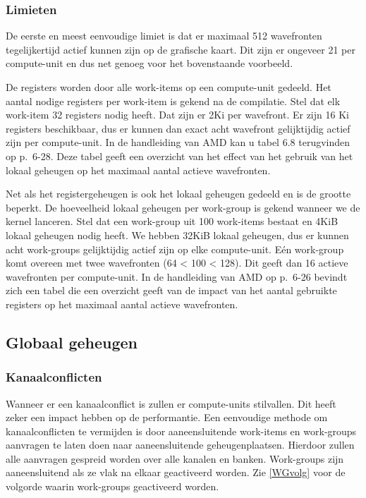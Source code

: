 \subsubsection{Limieten}
De eerste en meest eenvoudige limiet is dat er maximaal 512 wavefronten tegelijkertijd actief kunnen zijn op de grafische kaart. Dit zijn er ongeveer 21 per compute-unit en dus net genoeg voor het bovenstaande voorbeeld.

De registers worden door alle work-items op een compute-unit gedeeld. Het aantal nodige registers per work-item is gekend na de compilatie. Stel dat elk work-item 32 registers nodig heeft. Dat zijn er 2Ki per wavefront. Er zijn 16 Ki registers beschikbaar, dus er kunnen dan exact acht wavefront gelijktijdig actief zijn per compute-unit. In de handleiding van AMD \cite{amd} kan u tabel 6.8 terugvinden op p.~6-28. Deze tabel geeft een overzicht van het effect van het gebruik van het lokaal geheugen op het maximaal aantal actieve wavefronten.

Net als het registergeheugen is ook het lokaal geheugen gedeeld en is de grootte beperkt. De hoeveelheid lokaal geheugen per work-group is gekend wanneer we de kernel lanceren. Stel dat een work-group uit 100 work-items bestaat en 4KiB lokaal geheugen nodig heeft. We hebben 32KiB lokaal geheugen, dus er kunnen acht work-groups gelijktijdig actief zijn op elke compute-unit. E\'en work-group komt overeen met twee wavefronten (64 < 100 < 128). Dit geeft dan 16 actieve wavefronten per compute-unit.  In de handleiding van AMD \cite{amd} op p.~6-26 bevindt zich een tabel die een overzicht geeft van de impact van het aantal gebruikte registers op het maximaal aantal actieve wavefronten.


\subsection{Globaal geheugen}
\subsubsection{Kanaalconflicten}
Wanneer er een kanaalconflict is zullen er compute-units stilvallen. Dit heeft zeker een impact hebben op de performantie. Een eenvoudige methode om kanaalconflicten te vermijden is door aaneensluitende work-items en work-groups aanvragen te laten doen naar aaneensluitende geheugenplaatsen. Hierdoor zullen alle aanvragen gespreid worden over alle kanalen en banken. Work-groups zijn aaneensluitend als ze vlak na elkaar geactiveerd worden. Zie \ref{WGvolg} voor de volgorde waarin work-groups geactiveerd worden. 

